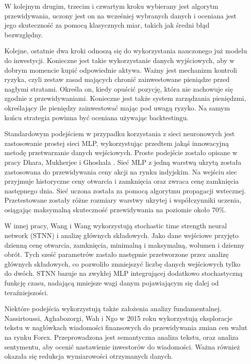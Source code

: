 \documentclass[twoside]{iisthesis}
\begin{document}
W kolejnym drugim, trzecim i czwartym kroku wybierany jest algorytm przewidywania, uczony jest on na wcześniej wybranych danych i oceniana jest jego skuteczność za pomocą klasycznych miar, takich jak średni błąd bezwzględny.

Kolejne, ostatnie dwa kroki odnoszą się do wykorzystania nauczonego już modelu do inwestycji. Konieczne jest takie wykorzystanie danych wyjściowych, aby w dobrym momencie kupić odpowiednie aktywa. Ważny jest mechanizm kontroli ryzyka, czyli zestaw zasad mających chronić zainwestowane pieniądze przed nagłymi stratami. Określa on, kiedy opuścić pozycję, która nie zachowuje się zgodnie z przewidywaniami. Konieczne jest także system zarządzania pieniędzmi, określający ile pieniędzy zainwestować mając pod uwagą ryzyko. Na samym końcu strategia powinna być oceniana używając backtestingu. 

Standardowym podejściem w przypadku korzystania z sieci neuronowych jest zastosowanie prostej sieci MLP, wykorzystując przedtem jakąś innowacyjną metodę przetwarzanie danych wejściowych. Proste podejście zostało opisane w pracy Dhara, Mukherjee i Ghoshala \cite{5738795}. Sieć MLP z jedną warstwą ukrytą została zastosowana do przewidywania ceny akcji na rynku indyjskim. Na wejściu siec przyjmuje historyczne ceny otwarcia i zamknięcia oraz zwraca cenę zamknięcia następnego dnia. Sieć uczona została za pomocą algorytmu propagacji wstecznej. Przetestowane zostały różne rozmiary warstwy ukrytej i współczynniki uczenia, osiągając maksymalną skuteczność przewidywania na poziomie około 70\%. 

W innej pracy, Wang i Wang wykorzystują stochastic time strength neural network (STNN) i analizę głównych składowych. Jako dane wejściowe przyjęto dzienną cenę otwarcia, zamknięcia, minimalną i maksymalną, wolumen i dzienny obrót. Tych sześć parametrów zastało następnie przetworzone przez analizę głównych składowych, co pozwoliło zmniejszyć liczbę danych wejściowych tylko do dwóch. STNN bazuje na zwykłej MLP integrującej dodatkowo stochastyczną funkcję czasu, nadającą mniejsze wagi danym pojawiającym się dalej od teraźniejszości.

Niektóre podejścia wykorzystują także założenia analizy fundamentalnej. Nassirtoussi, Aghabozorgi, Wah i Ngo w 2015 roku \cite{KhadjehNassirtoussi2015306} wykorzystują eksploracje tekstu w nagłówkach wiadomości finansowych do przewidywania zmian cen walut na rynku Forex. Przeprowadzona jest semantyczna analiza tekstu, oraz analiza sentymentu, aby ocenić nastawienie inwestorów do wiadomości. Ważna również okazała się redukcja wymiarowości otrzymanych danych.
\end{document}
